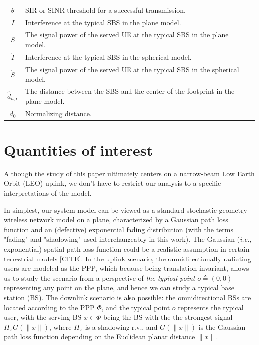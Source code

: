 \documentclass[lettersize,journal]{IEEEtran}
\begin{document}
\begin{table}
\begin{center}
\begin{tabular}{| c | p{4.5cm}  |p{1.5cm}|}
      $\theta$ & SIR or SINR threshold for a successful transmission.&\\
      $I$ & Interference at the typical SBS in the plane model.&\\
      $S$ & The signal power of the served UE at the typical SBS in the plane model.&\\
      $\mathring{I}$ & Interference at the typical SBS in the spherical model.&\\
      $\mathring{S}$ & The signal power of the served UE at the typical SBS in the spherical model.&\\ 
      $\hat{d}_{h,\epsilon}$ & The distance between the SBS and the center of the footprint in the plane model.&\\
      $d_{0}$ & Normalizing distance. & \\                        
      \hline
    \end{tabular}
  \end{center}
\end{table}   


\section{Quantities of interest}
\label{sec:analysissec}

Although the study of this paper ultimately centers on a narrow-beam Low Earth Orbit (LEO) uplink, we don't have to restrict our analysis to a specific interpretations of the model.

In simplest, our system model can be viewed as a standard stochastic geometry wireless network model on a plane, characterized by a Gaussian path loss function and an (defective) exponential fading distribution (with the terms "fading" and "shadowing" used interchangeably in this work). The Gaussian (\textit{i.e.}, exponential) spatial path loss function could be a realistic assumption in certain terrestrial models [CITE]. In the uplink scenario, the omnidirectionally radiating users are modeled as the PPP, which because being translation invariant, allows us to study the scenario from a perspective of \textit{the typical point} $\textit{o} \triangleq (0,0)$ representing any point on the plane, and hence we can study a typical base station (BS). The downlink scenario is also possible: the omnidirectional BSs are located according to the PPP $\Phi$, and the typical point $\textit{o}$ represents the typical user, with the serving BS $x \in \Phi$ being the BS with the the strongest signal $H_xG(\|x\|)$, where $H_x$ is a shadowing r.v., and $G(\|x\|)$ is the Gaussian path loss function depending on the Euclidean planar distance $\|x\|$.
\end{document}
